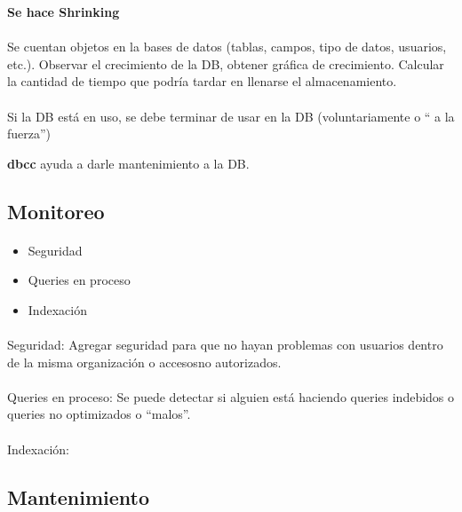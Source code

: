 \documentclass{article}
\begin{document}
\textbf{Se hace Shrinking}

\paragraph{}
Se cuentan objetos en la bases de datos (tablas, campos, tipo de datos, usuarios,
etc.).
Observar el crecimiento de la DB, obtener gráfica de crecimiento.
Calcular la cantidad de tiempo que podría tardar en llenarse el almacenamiento.

\paragraph{}
Si la DB está en uso, se debe terminar de usar en la DB (voluntariamente o
`` a la fuerza'')

\textbf{dbcc} ayuda a darle mantenimiento a la DB.

\subsection{Monitoreo}

\paragraph{}
\begin{itemize}
	\item
	Seguridad
	\item
	Queries en proceso
	\item
	Indexación
\end{itemize}

\paragraph{}
Seguridad:
Agregar seguridad para que no hayan problemas con usuarios dentro de la misma
organización o accesosno autorizados.

\paragraph{}
Queries en proceso:
Se puede detectar si alguien está haciendo queries indebidos o queries no
optimizados o ``malos''.

\paragraph{}
Indexación:

\subsection{Mantenimiento}
\end{document}
